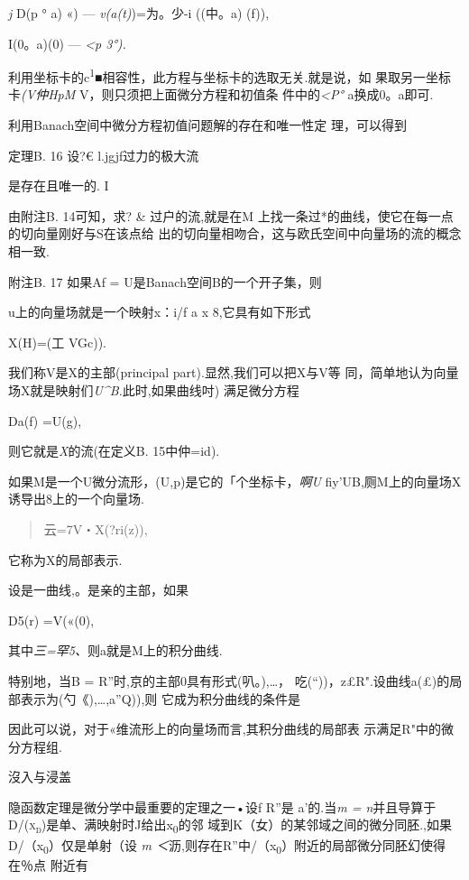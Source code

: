 \documentclass{article}
\begin{document}
\emph{j} D(p ° a) «) --- \emph{v(a(t)})=为。少-i ((中。a) (f)),

I(0。a)(0) --- \emph{\textless{}p 3°).}

利用坐标卡的c\textsuperscript{1}■相容性，此方程与坐标卡的选取无关.就是说，如
果取另一坐标卡\emph{(V仲HpM} V，则只须把上面微分方程和初值条
件中的\emph{\textless{}P°} a换成0。a即可.

利用Banach空间中微分方程初值问题解的存在和唯一性定 理，可以得到

定理B. 16 设?€ l.jgjf过力的极大流

是存在且唯一的. I

由附注B. 14可知，求? \& 过户的流,就是在M
上找一条过*的曲线，使它在每一点的切向量刚好与S在该点给
出的切向量相吻合，这与欧氏空间中向量场的流的概念相一致.

附注B. 17 如果Af = U是Banach空间B的一个开子集，则

u上的向量场就是一个映射x：i/f a x 8,它具有如下形式

X(H)=(工 VGc)).

我们称V是X的主部(principal part).显然,我们可以把X与V等
同，简单地认为向量场X就是映射们\emph{U\^{}B.}此时,如果曲线吋)
满足微分方程

Da(f) =U(g),

则它就是\emph{X}的流(在定义B. 15中仲=id).

如果M是一个U微分流形，(U,p)是它的「个坐标卡，\emph{啊U}
fiy'UB,厕M上的向量场X诱导出8上的一个向量场.

\begin{quote}
云=7V・X(?ri(z)),
\end{quote}

它称为X的局部表示.

设是一曲线,。是亲的主部，如果

D5(r) =V(«(0),

其中\emph{三=罕5、}则a就是M上的积分曲线.

特别地，当B = R''时,京的主部0具有形式(叭。),\ldots{}，
吃(``))，z£R".设曲线a(£)的局部表示为(勺《),\ldots{},a''Q)),则
它成为积分曲线的条件是

因此可以说，对于«维流形上的向量场而言,其积分曲线的局部表
示满足R"中的微分方程组.

沒入与浸盖

隐函数定理是微分学中最重要的定理之一•设f R''是 a'的.当\emph{m =
n}并且导算于\textsc{D/(x\textsubscript{d})}是单、满映射时J给出x\textsubscript{0}的邻
域到K（女）的某邻域之间的微分同胚.,如果D/（x\textsubscript{0}）仅是单射（设
\emph{m
＜}沥,则存在R''中/（x\textsubscript{0}）附近的局部微分同胚幻使得在％点
附近有
\end{document}
